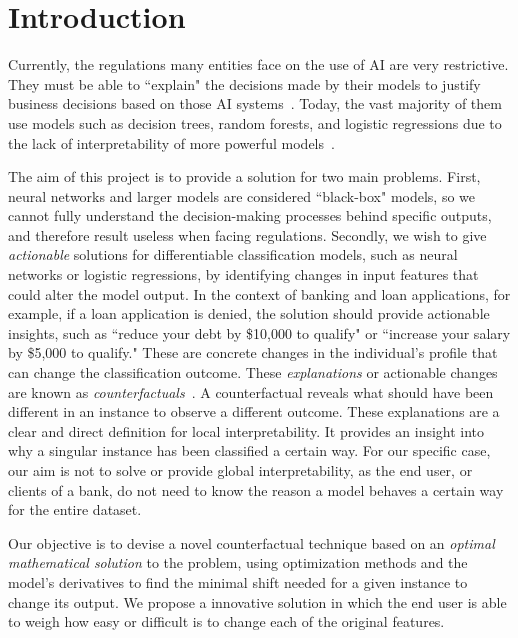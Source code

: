 \documentclass[12pt]{extarticle}
\numberwithin{equation}{section}
\begin{document}
\section{Introduction}
Currently, the regulations many entities face on the use of AI are very restrictive. They must be able to ``explain" the decisions made by their models to justify business decisions based on those AI systems~\cite{cohen2021black}. Today, the vast majority of them use models such as decision trees, random forests, and logistic regressions due to the lack of interpretability of more powerful models~\cite{ghatasheh2014business,pointofview}. 

The aim of this project is to provide a solution for two main problems. First, neural networks and larger models are considered ``black-box" models, so we cannot fully understand the decision-making processes behind specific outputs, and therefore result useless when facing regulations. Secondly, we wish to give \emph{actionable} solutions for differentiable classification models, such as neural networks or logistic regressions, by identifying changes in input features that could alter the model output. In the context of banking and loan applications, for example, if a loan application is denied, the solution should provide actionable insights, such as ``reduce your debt by \$10,000 to qualify" or ``increase your salary by \$5,000 to qualify." These are concrete changes in the individual's profile that can change the classification outcome. These \emph{explanations} or actionable changes are known as \emph{counterfactuals}~\cite{wachter2017counterfactual,guidotti2024counterfactual}. A counterfactual reveals what should have been different in an instance to observe a different outcome. These explanations are a clear and direct definition for local interpretability. It provides an insight into why a singular instance has been classified a certain way. For our specific case, our aim is not to solve or provide global interpretability, as the end user, or clients of a bank, do not need to know the reason a model behaves a certain way for the entire dataset.

Our objective is to devise a novel counterfactual technique based on an \emph{optimal mathematical solution} to the problem, using optimization methods and the model's derivatives to find the minimal shift needed for a given instance to change its output. We propose a innovative solution in which the end user is able to weigh how easy or difficult is to change each of the original features.
\end{document}

